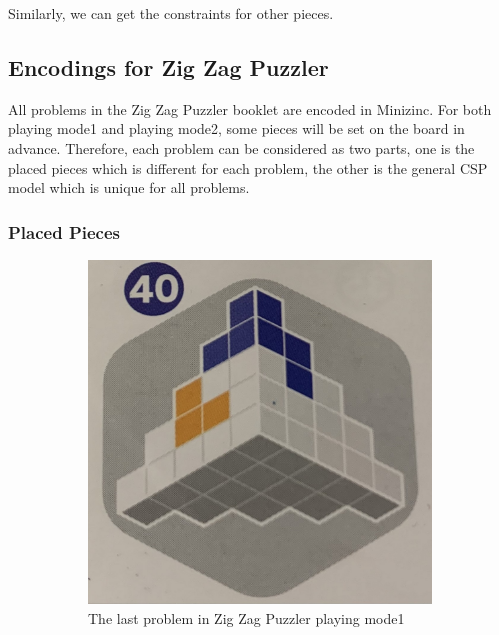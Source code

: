 Similarly, we can get the constraints for other pieces.
\subsection{Encodings for Zig Zag Puzzler}
All problems in the Zig Zag Puzzler booklet are encoded in Minizinc. For both playing mode1 and playing mode2, some pieces will be set on the board in advance. Therefore, each problem can be considered as two parts, one is the placed pieces which is different for each problem, the other is the general CSP model which is unique for all problems. 
\subsubsection{Placed Pieces}
\begin{figure}[htbp]
    \centering
    \begin{subfigure}[b]{.45\textwidth}
    \centering
    \includegraphics[width=\textwidth]{figs/mode1.jpg}
    \caption{The last problem in Zig Zag Puzzler playing mode1}
    \label{fig:game2mode1}
    \end{subfigure}
     \begin{subfigure}[b]{.45\textwidth}
     \centering

\end{subfigure}
\end{figure}
